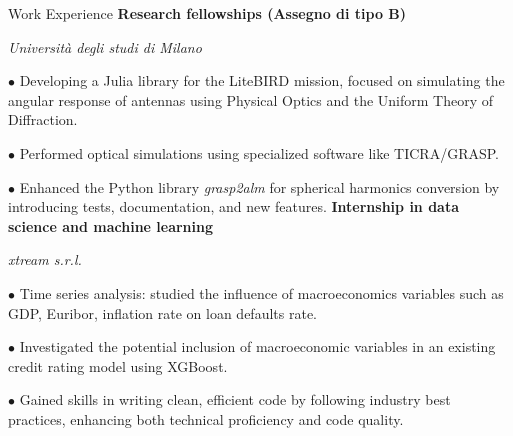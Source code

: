 \begin{rubric}{Work Experience}
\entry*[2024/2025]%
    \textbf{Research fellowships (Assegno di tipo B)}
    \par\textit{Università degli studi di Milano}
    \par $\bullet$ Developing a Julia library for the LiteBIRD mission, focused on simulating the angular response of antennas using Physical Optics and the Uniform Theory of Diffraction.
    \par $\bullet$ Performed optical simulations using specialized software like TICRA/GRASP.
    \par $\bullet$ Enhanced the Python library \textit{grasp2alm} for spherical harmonics conversion by introducing tests, documentation, and new features.
\entry*[2024]%
    \textbf{Internship in data science and machine learning}
    \par \textit{xtream s.r.l.}
    \par $\bullet$ Time series analysis: studied the influence of macroeconomics variables such as GDP, Euribor, inflation rate on loan defaults rate.
    \par $\bullet$ Investigated the potential inclusion of macroeconomic variables in an existing credit rating model using XGBoost.
    \par $\bullet$ Gained skills in writing clean, efficient code by following industry best practices, enhancing both technical proficiency and code quality.
\end{rubric}